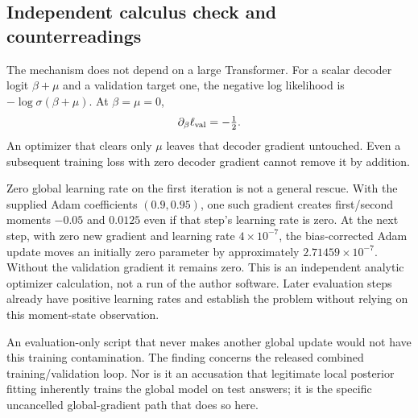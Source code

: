 \documentclass[10pt]{article}
\begin{document}
\subsection*{Independent calculus check and counterreadings}
The mechanism does not depend on a large Transformer. For a scalar decoder logit \(\beta+\mu\) and a validation target one, the negative log likelihood is \(-\log\sigma(\beta+\mu)\). At \(\beta=\mu=0\), \[\partial_\beta\ell_{\rm val}=-\tfrac12.\] An optimizer that clears only \(\mu\) leaves that decoder gradient untouched. Even a subsequent training loss with zero decoder gradient cannot remove it by addition.\par
Zero global learning rate on the first iteration is not a general rescue. With the supplied Adam coefficients \((0.9,0.95)\), one such gradient creates first/second moments \(-0.05\) and \(0.0125\) even if that step’s learning rate is zero. At the next step, with zero new gradient and learning rate \(4\times10^{-7}\), the bias-corrected Adam update moves an initially zero parameter by approximately \(2.71459\times10^{-7}\). Without the validation gradient it remains zero. This is an independent analytic optimizer calculation, not a run of the author software. Later evaluation steps already have positive learning rates and establish the problem without relying on this moment-state observation.\par
An evaluation-only script that never makes another global update would not have this training contamination. The finding concerns the released combined training/validation loop. Nor is it an accusation that legitimate local posterior fitting inherently trains the global model on test answers; it is the specific uncancelled global-gradient path that does so here.\par
\end{document}
